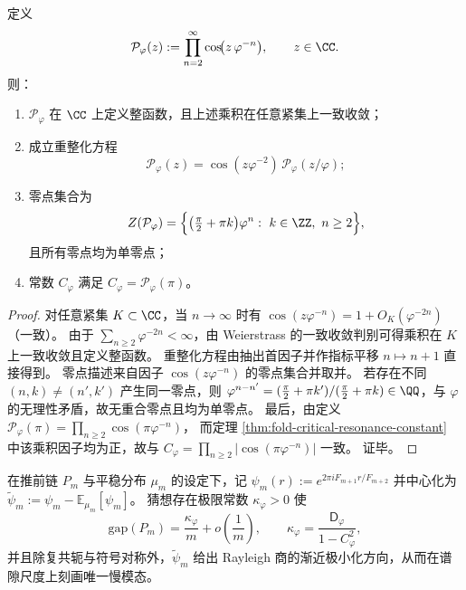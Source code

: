 \begin{proposition}\label{prop:fold-cosine-product-entire-renormalization-zeros}
定义
\[
\mathcal P_\varphi(z):=\prod_{n=2}^{\infty}\cos\!\bigl(z\,\varphi^{-n}\bigr),\qquad z\in\CC.
\]
则：
\begin{enumerate}
  \item \(\mathcal P_\varphi\) 在 \(\CC\) 上定义整函数，且上述乘积在任意紧集上一致收敛；
  \item 成立重整化方程
  \[
  \mathcal P_\varphi(z)=\cos(z\varphi^{-2})\,\mathcal P_\varphi(z/\varphi);
  \]
  \item 零点集合为
  \[
  Z(\mathcal P_\varphi)=\Bigl\{\bigl(\tfrac{\pi}{2}+\pi k\bigr)\varphi^{n}:\ k\in\ZZ,\ n\ge 2\Bigr\},
  \]
  且所有零点均为单零点；
  \item 常数 \(C_\varphi\) 满足 \(C_\varphi=\mathcal P_\varphi(\pi)\)。
\end{enumerate}
\end{proposition}

\begin{proof}
对任意紧集 \(K\subset\CC\)，当 \(n\to\infty\) 时有
\(
\cos(z\varphi^{-n})=1+O_K(\varphi^{-2n})
\)（一致）。
由于 \(\sum_{n\ge 2}\varphi^{-2n}<\infty\)，由 Weierstrass 的一致收敛判别可得乘积在 \(K\) 上一致收敛且定义整函数。
重整化方程由抽出首因子并作指标平移 \(n\mapsto n+1\) 直接得到。
零点描述来自因子 \(\cos(z\varphi^{-n})\) 的零点集合并取并。
若存在不同 \((n,k)\neq(n',k')\) 产生同一零点，则
\(
\varphi^{n-n'}=(\frac{\pi}{2}+\pi k')/(\frac{\pi}{2}+\pi k)\in\QQ
\)，与 \(\varphi\) 的无理性矛盾，故无重合零点且均为单零点。
最后，由定义
\(
\mathcal P_\varphi(\pi)=\prod_{n\ge 2}\cos(\pi\varphi^{-n})
\)，
而定理 \ref{thm:fold-critical-resonance-constant} 中该乘积因子均为正，故与 \(C_\varphi=\prod_{n\ge 2}|\cos(\pi\varphi^{-n})|\) 一致。
证毕。
\end{proof}

\begin{conjecture}[残差推前链谱隙的精确渐近与慢模态唯一性]\label{conj:fold-residual-gap-asymptotic-unique-slowmode}
在推前链 \(P_m\) 与平稳分布 \(\mu_m\) 的设定下，记
\(
\psi_m(r):=e^{2\pi i F_{m+1}r/F_{m+2}}
\)
并中心化为 \(\widetilde\psi_m:=\psi_m-\mathbb E_{\mu_m}[\psi_m]\)。
猜想存在极限常数 \(\kappa_\varphi>0\) 使
\[
\mathrm{gap}(P_m)=\frac{\kappa_\varphi}{m}+o\!\left(\frac{1}{m}\right),
\qquad
\kappa_\varphi=\frac{\mathsf D_\varphi}{1-C_\varphi^2},
\]
并且除复共轭与符号对称外，\(\widetilde\psi_m\) 给出 Rayleigh 商的渐近极小化方向，从而在谱隙尺度上刻画唯一慢模态。
\end{conjecture}

\endinput
